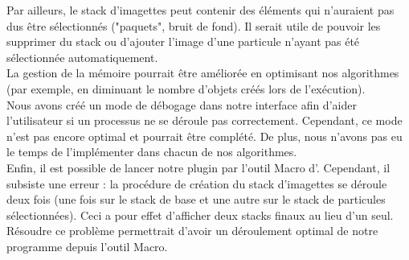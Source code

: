 Par ailleurs, le stack d'imagettes peut contenir des éléments qui n'auraient pas dus être sélectionnés ("paquets", bruit de fond). Il serait utile de pouvoir les supprimer du stack ou d'ajouter l'image d'une particule n'ayant pas été sélectionnée automatiquement. \\

La gestion de la mémoire pourrait être améliorée en optimisant nos algorithmes (par exemple, en diminuant le nombre d'objets créés lors de l'exécution). \\

Nous avons créé un mode de débogage dans notre interface afin d'aider l'utilisateur si un processus ne se déroule pas correctement. Cependant, ce mode n'est pas encore optimal et pourrait être complété. De plus, nous n'avons pas eu le temps de l'implémenter dans chacun de nos algorithmes. \\

Enfin, il est possible de lancer notre plugin par l'outil Macro d'\imj. Cependant, il subsiste une erreur : la procédure de création du stack d'imagettes se déroule deux fois (une fois sur le stack de base et une autre sur le stack de particules sélectionnées). Ceci a pour effet d'afficher deux stacks finaux au lieu d'un seul. Résoudre ce problème permettrait d'avoir un déroulement optimal de notre programme depuis l'outil Macro. 


















